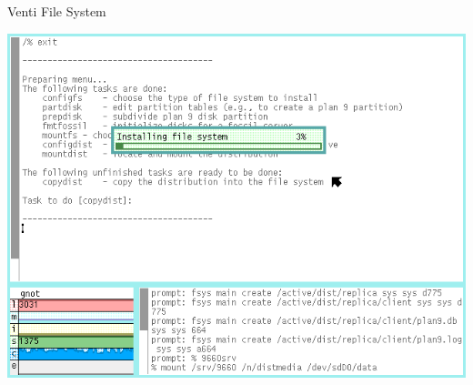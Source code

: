 \begin{frame}[t]{Venti File System}

  \hspace*{.6in}
  \begin{minipage}{3.5in}
  \begin{center}

  	\includegraphics[scale=.40]{plan9simple.png}
	  
  \end{center}
  \end{minipage}

\end{frame}